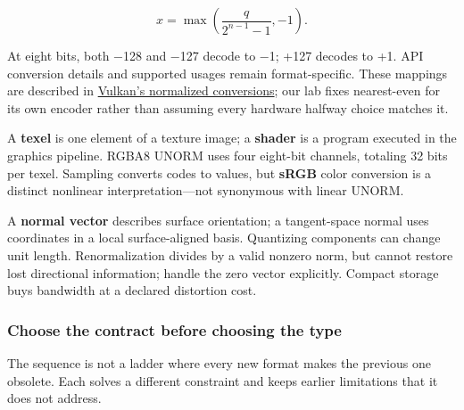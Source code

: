 \[
x=\max\!\left(\frac{q}{2^{n-1}-1},-1\right).
\]

At eight bits, both −128 and −127 decode to −1; +127 decodes to +1. API conversion details and supported usages remain format-specific. These mappings are described in \href{https://docs.vulkan.org/spec/latest/chapters/fundamentals.html\#fundamentals-fixedfpconv}{Vulkan's normalized conversions}; our lab fixes nearest-even for its own encoder rather than assuming every hardware halfway choice matches it.

A \textbf{texel} is one element of a texture image; a \textbf{shader} is a program executed in the graphics pipeline. RGBA8 UNORM uses four eight-bit channels, totaling 32 bits per texel. Sampling converts codes to values, but \textbf{sRGB} color conversion is a distinct nonlinear interpretation---not synonymous with linear UNORM.

A \textbf{normal vector} describes surface orientation; a tangent-space normal uses coordinates in a local surface-aligned basis. Quantizing components can change unit length. Renormalization divides by a valid nonzero norm, but cannot restore lost directional information; handle the zero vector explicitly. Compact storage buys bandwidth at a declared distortion cost.

\subsubsection{Choose the contract before choosing the type}\label{01-foundations-i-ch001-choose-the-contract-before-choosing-the-type}

\hypertarget{01-foundations-i-ch001-choose-the-contract-before-choosing-the-type}{}

The sequence is not a ladder where every new format makes the previous one obsolete. Each solves a different constraint and keeps earlier limitations that it does not address.


